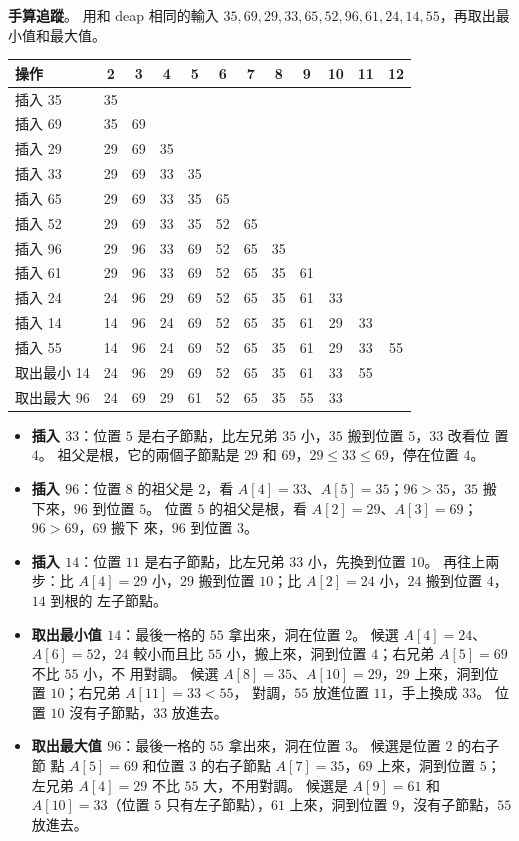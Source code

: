 \textbf{手算追蹤}。 用和 deap 相同的輸入 $35, 69, 29, 33, 65, 52, 96, 61, 24, 14, 55$，再取出最
小值和最大值。

\begin{center}
\small
\begin{tabular}{l*{11}{c}}
\toprule
操作 & 2 & 3 & 4 & 5 & 6 & 7 & 8 & 9 & 10 & 11 & 12 \\
\midrule
插入 35 & 35 \\
插入 69 & 35 & 69 \\
插入 29 & 29 & 69 & 35 \\
插入 33 & 29 & 69 & 33 & 35 \\
插入 65 & 29 & 69 & 33 & 35 & 65 \\
插入 52 & 29 & 69 & 33 & 35 & 52 & 65 \\
插入 96 & 29 & 96 & 33 & 69 & 52 & 65 & 35 \\
插入 61 & 29 & 96 & 33 & 69 & 52 & 65 & 35 & 61 \\
插入 24 & 24 & 96 & 29 & 69 & 52 & 65 & 35 & 61 & 33 \\
插入 14 & 14 & 96 & 24 & 69 & 52 & 65 & 35 & 61 & 29 & 33 \\
插入 55 & 14 & 96 & 24 & 69 & 52 & 65 & 35 & 61 & 29 & 33 & 55 \\
\midrule
取出最小 14 & 24 & 96 & 29 & 69 & 52 & 65 & 35 & 61 & 33 & 55 \\
取出最大 96 & 24 & 69 & 29 & 61 & 52 & 65 & 35 & 55 & 33 \\
\bottomrule
\end{tabular}
\end{center}

\begin{itemize}
\item \textbf{插入 $33$}：位置 $5$ 是右子節點，比左兄弟 $35$ 小，$35$ 搬到位置 $5$，$33$ 改看位
置 $4$。 祖父是根，它的兩個子節點是 $29$ 和 $69$，$29 \le 33 \le 69$，停在位置 $4$。
\item \textbf{插入 $96$}：位置 $8$ 的祖父是 $2$，看 $A[4] = 33$、$A[5] = 35$；$96 > 35$，$35$ 搬
下來，$96$ 到位置 $5$。 位置 $5$ 的祖父是根，看 $A[2] = 29$、$A[3] = 69$；$96 > 69$，$69$ 搬下
來，$96$ 到位置 $3$。
\item \textbf{插入 $14$}：位置 $11$ 是右子節點，比左兄弟 $33$ 小，先換到位置 $10$。 再往上兩
步：比 $A[4] = 29$ 小，$29$ 搬到位置 $10$；比 $A[2] = 24$ 小，$24$ 搬到位置 $4$，$14$ 到根的
左子節點。
\item \textbf{取出最小值 $14$}：最後一格的 $55$ 拿出來，洞在位置 $2$。 候選 $A[4] = 24$、
$A[6] = 52$，$24$ 較小而且比 $55$ 小，搬上來，洞到位置 $4$；右兄弟 $A[5] = 69$ 不比 $55$ 小，不
用對調。 候選 $A[8] = 35$、$A[10] = 29$，$29$ 上來，洞到位置 $10$；右兄弟 $A[11] = 33 < 55$，
對調，$55$ 放進位置 $11$，手上換成 $33$。 位置 $10$ 沒有子節點，$33$ 放進去。
\item \textbf{取出最大值 $96$}：最後一格的 $55$ 拿出來，洞在位置 $3$。 候選是位置 $2$ 的右子節
點 $A[5] = 69$ 和位置 $3$ 的右子節點 $A[7] = 35$，$69$ 上來，洞到位置 $5$；左兄弟 $A[4] = 29$
不比 $55$ 大，不用對調。 候選是 $A[9] = 61$ 和 $A[10] = 33$（位置 $5$ 只有左子節點），$61$
上來，洞到位置 $9$，沒有子節點，$55$ 放進去。
\end{itemize}

